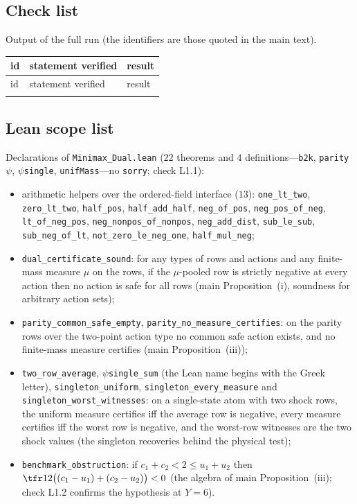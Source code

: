 \subsection{Check list}
Output of the full run (the identifiers are those quoted in the main text).
\begin{footnotesize}
\begin{longtable}{p{1.1cm}p{12.6cm}p{0.9cm}}
\toprule
id & statement verified & result\\
\midrule
\endfirsthead
\toprule
id & statement verified & result\\
\midrule
\endhead
\bottomrule
\endlastfoot

\end{longtable}
\end{footnotesize}

\subsection{Lean scope list}
Declarations of \texttt{Minimax\_Dual.lean} ($22$ theorems and $4$ definitions---\texttt{b2k}, \texttt{parity}$\psi$, $\psi$\texttt{single}, \texttt{unifMass}---no \texttt{sorry}; check L1.1):
\begin{itemize}[leftmargin=1.4em,itemsep=0pt]\sloppy
\item arithmetic helpers over the ordered-field interface ($13$): \texttt{one\_lt\_two}, \texttt{zero\_lt\_two}, \texttt{half\_pos}, \texttt{half\_add\_half}, \texttt{neg\_of\_pos}, \texttt{neg\_pos\_of\_neg}, \texttt{lt\_of\_neg\_pos}, \texttt{neg\_nonpos\_of\_nonpos}, \texttt{neg\_add\_dist}, \texttt{sub\_le\_sub}, \texttt{sub\_neg\_of\_lt}, \texttt{not\_zero\_le\_neg\_one}, \texttt{half\_mul\_neg};
\item \texttt{dual\_certificate\_sound}: for any types of rows and actions and any finite-mass measure $\mu$ on the rows, if the $\mu$-pooled row is strictly negative at every action then no action is safe for all rows (main Proposition~(i), soundness for arbitrary action sets);
\item \texttt{parity\_common\_safe\_empty}, \texttt{parity\_no\_measure\_certifies}: on the parity rows over the two-point action type no common safe action exists, and no finite-mass measure certifies (main Proposition~(iii));
\item \texttt{two\_row\_average}, $\psi$\texttt{single\_sum} (the Lean name begins with the Greek letter), \texttt{singleton\_uniform}, \texttt{singleton\_every\_measure} and \texttt{singleton\_worst\_\allowbreak witnesses}: on a single-state atom with two shock rows, the uniform measure certifies iff the average row is negative, every measure certifies iff the worst row is negative, and the worst-row witnesses are the two shock values (the singleton recoveries behind the physical test);
\item \texttt{benchmark\_obstruction}: if $c_1+c_2<2\le u_1+u_2$ then $\tfr12\bigl((c_1-u_1)+(c_2-u_2)\bigr)<0$ (the algebra of main Proposition~(iii); check L1.2 confirms the hypothesis at $Y=6$).
\end{itemize}
